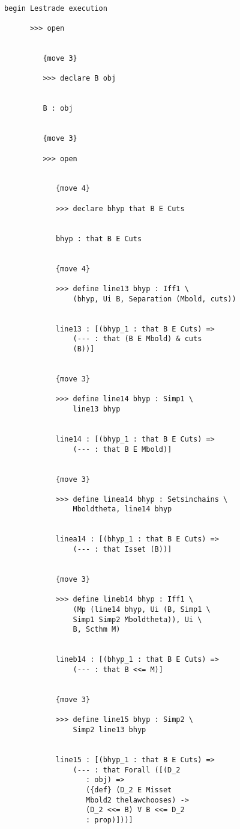 \documentclass[12pt]{article}
\begin{document}
\begin{verbatim}

begin Lestrade execution

      >>> open


         {move 3}

         >>> declare B obj


         B : obj


         {move 3}

         >>> open


            {move 4}

            >>> declare bhyp that B E Cuts


            bhyp : that B E Cuts


            {move 4}

            >>> define line13 bhyp : Iff1 \
                (bhyp, Ui B, Separation (Mbold, cuts))


            line13 : [(bhyp_1 : that B E Cuts) => 
                (--- : that (B E Mbold) & cuts 
                (B))]


            {move 3}

            >>> define line14 bhyp : Simp1 \
                line13 bhyp


            line14 : [(bhyp_1 : that B E Cuts) => 
                (--- : that B E Mbold)]


            {move 3}

            >>> define linea14 bhyp : Setsinchains \
                Mboldtheta, line14 bhyp


            linea14 : [(bhyp_1 : that B E Cuts) => 
                (--- : that Isset (B))]


            {move 3}

            >>> define lineb14 bhyp : Iff1 \
                (Mp (line14 bhyp, Ui (B, Simp1 \
                Simp1 Simp2 Mboldtheta)), Ui \
                B, Scthm M)


            lineb14 : [(bhyp_1 : that B E Cuts) => 
                (--- : that B <<= M)]


            {move 3}

            >>> define line15 bhyp : Simp2 \
                Simp2 line13 bhyp


            line15 : [(bhyp_1 : that B E Cuts) => 
                (--- : that Forall ([(D_2 
                   : obj) => 
                   ({def} (D_2 E Misset 
                   Mbold2 thelawchooses) -> 
                   (D_2 <<= B) V B <<= D_2 
                   : prop)]))]



\end{verbatim}
\end{document}
